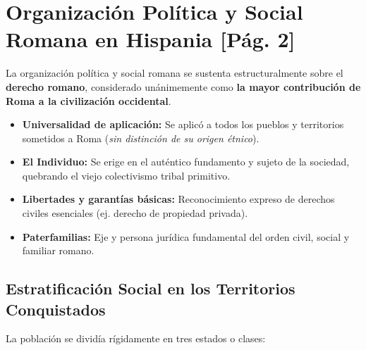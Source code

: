 \documentclass[11pt,letterpaper]{article}
\begin{document}
\bigskip

\newpage
\section{Organización Política y Social Romana en Hispania \hfill\normalfont\small\color{gray}[Pág. 2]}

\begin{conceptbox}[title={El Pilar Jurídico: El Derecho Romano}]
  La organización política y social romana se sustenta estructuralmente sobre el \textbf{derecho romano}, considerado unánimemente como \textbf{la mayor contribución de Roma a la civilización occidental}.
  \begin{itemize}
    \item \textbf{Universalidad de aplicación:} Se aplicó a todos los pueblos y territorios sometidos a Roma (\textit{sin distinción de su origen étnico}).
    \item \textbf{El Individuo:} Se erige en el auténtico fundamento y sujeto de la sociedad, quebrando el viejo colectivismo tribal primitivo.
    \item \textbf{Libertades y garantías básicas:} Reconocimiento expreso de derechos civiles esenciales (ej. derecho de propiedad privada).
    \item \textbf{Paterfamilias:} Eje y persona jurídica fundamental del orden civil, social y familiar romano.
  \end{itemize}
\end{conceptbox}

\subsection{Estratificación Social en los Territorios Conquistados}
La población se dividía rígidamente en tres estados o clases:
\end{document}
